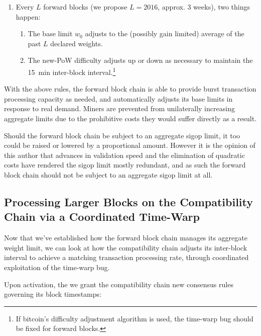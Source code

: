 \begin{enumerate}
\begin{enumerate}
  \item

    Every $L$ forward blocks (we propose $L = 2016$, approx. \num{3}
    weeks), two things happen:

    \begin{enumerate}

      \item

        The base limit $w_0$ adjusts to the (possibly gain limited)
        average of the past $L$ declared weights.

      \item

        The new-PoW difficulty adjusts up or down as necessary to
        maintain the \SI{15}{\minute} inter-block
        interval.\footnote{If bitcoin's difficulty adjustment
        algorithm is used, the time-warp bug should be fixed for
        forward blocks.}

    \end{enumerate}

\end{enumerate}

With the above rules, the forward block chain is able to provide burst
transaction processing capacity as needed, and automatically adjusts
its base limits in response to real demand.  Miners are prevented from
unilaterally increasing aggregate limits due to the prohibitive costs
they would suffer directly as a result.

Should the forward block chain be subject to an aggregate sigop limit,
it too could be raised or lowered by a proportional amount.  However
it is the opinion of this author that advances in validation speed and
the elimination of quadratic costs have rendered the sigop limit
mostly redundant, and as such the forward block chain should not be
subject to an aggregate sigop limit at all.

\subsection{Processing Larger Blocks on the Compatibility Chain via a Coordinated Time-Warp}

Now that we've established how the forward block chain manages its
aggregate weight limit, we can look at how the compatibility chain
adjusts its inter-block interval to achieve a matching transaction
processing rate, through coordinated exploitation of the time-warp
bug.

Upon activation, the we grant the compatibility chain new consensus
rules governing its block timestamps:


\end{enumerate}
